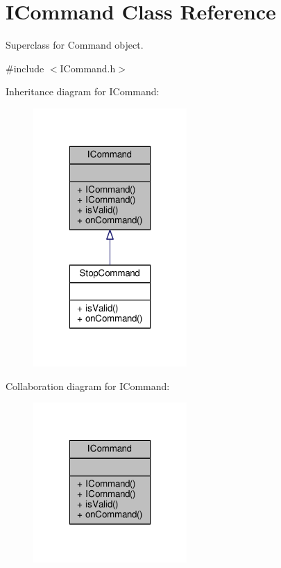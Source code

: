 \hypertarget{class_i_command}{\section{I\-Command Class Reference}
\label{class_i_command}
}


Superclass for Command object.  




{\ttfamily \#include $<$I\-Command.\-h$>$}



Inheritance diagram for I\-Command\-:
\nopagebreak
\begin{figure}[H]
\begin{center}
\leavevmode
\includegraphics[width=166pt]{class_i_command__inherit__graph}
\end{center}
\end{figure}


Collaboration diagram for I\-Command\-:
\nopagebreak
\begin{figure}[H]
\begin{center}
\leavevmode
\includegraphics[width=166pt]{class_i_command__coll__graph}
\end{center}
\end{figure}
